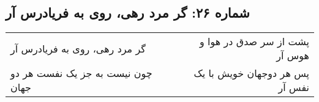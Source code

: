 \begin{center}
\section*{شماره ۲۶: گر مرد رهی، روی به فریادرس آر}
\label{sec:026}
\begin{longtable}{l p{0.5cm} r}
گر مرد رهی، روی به فریادرس آر
&&
پشت از سر صدق در هوا و هوس آر
\\
چون نیست به جز یک نفست هر دو جهان
&&
پس هر دوجهان خویش با یک نفس آر
\\
\end{longtable}
\end{center}
